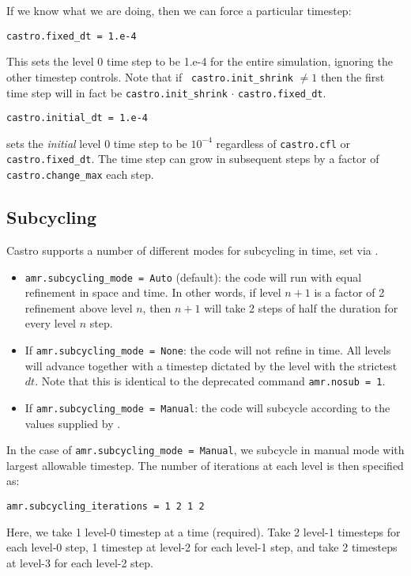 If we know what we are doing, then we can force a particular timestep:
\begin{lstlisting}
castro.fixed_dt = 1.e-4
\end{lstlisting}
This sets the level 0 time step to be 1.e-4 for the entire simulation,
ignoring the other timestep controls.  Note that if {\tt
  castro.init\_shrink} $\neq 1$ then the first time step will in fact
be {\tt castro.init\_shrink} $\cdot$ {\tt castro.fixed\_dt}. \newline

\begin{lstlisting}
castro.initial_dt = 1.e-4
\end{lstlisting}
sets the {\it initial} level 0 time step to be $10^{-4}$ regardless of 
{\tt castro.cfl} or {\tt castro.fixed\_dt}.  The time step can
grow in subsequent steps by a factor of {\tt castro.change\_max} each step.


\subsection{Subcycling}
Castro supports a number of different modes for subcycling in time,
set via .

\begin{itemize}
\item {\tt amr.subcycling\_mode = Auto} (default): the code will run
  with equal refinement in space and time. In other words, if level
  $n+1$ is a factor of 2 refinement above level $n$, then $n+1$ will
  take 2 steps of half the duration for every level $n$ step.

\item If {\tt amr.subcycling\_mode = None}: the code will not refine
  in time. All levels will advance together with a timestep dictated
  by the level with the strictest $dt$. Note that this is identical to
  the deprecated command {\tt amr.nosub = 1}.

\item If {\tt amr.subcycling\_mode = Manual}: the code will subcycle
  according to the values supplied by .

\end{itemize}

In the case of {\tt amr.subcycling\_mode = Manual}, we subcycle in
manual mode with largest allowable timestep.  The number of iterations
at each level is then specified as:
\begin{lstlisting}
amr.subcycling_iterations = 1 2 1 2
\end{lstlisting}
Here, we take 1 level-0 timestep at a time (required). Take 2 level-1
timesteps for each level-0 step, 1 timestep at level-2 for each
level-1 step, and take 2 timesteps at level-3 for each level-2 step.

